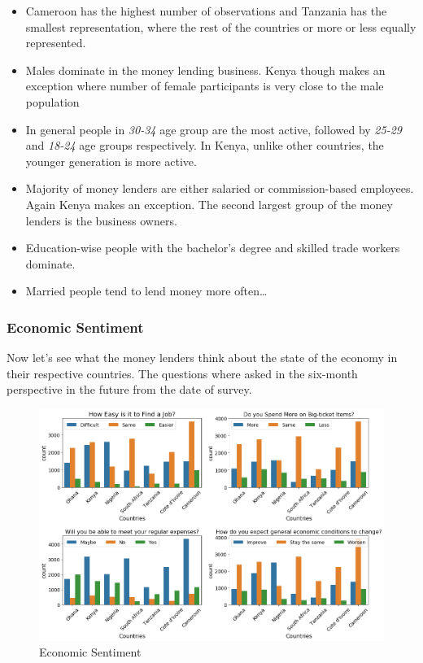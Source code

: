 \begin{itemize}
\tightlist
\item
  Cameroon has the highest number of observations and Tanzania has the
  smallest representation, where the rest of the countries or more or
  less equally represented.
\item
  Males dominate in the money lending business. Kenya though makes an
  exception where number of female participants is very close to the
  male population
\item
  In general people in \emph{30-34} age group are the most active,
  followed by \emph{25-29} and \emph{18-24} age groups respectively. In
  Kenya, unlike other countries, the younger generation is more active.
\item
  Majority of money lenders are either salaried or commission-based
  employees. Again Kenya makes an exception. The second largest group of
  the money lenders is the business owners.
\item
  Education-wise people with the bachelor's degree and skilled trade
  workers dominate.
\item
  Married people tend to lend money more often\ldots{}
\end{itemize}

\hypertarget{economic-sentiment}{%
\subsubsection{Economic Sentiment}\label{economic-sentiment}}

Now let's see what the money lenders think about the state of the
economy in their respective countries. The questions where asked in the
six-month perspective in the future from the date of survey.

\begin{Schunk}
\begin{figure}[H]

{\centering \includegraphics[width=1.15\linewidth]{../../artifacts/sentiment} 

}

\caption[Economic Sentiment]{Economic Sentiment}\label{fig:esent}
\end{figure}
\end{Schunk}

